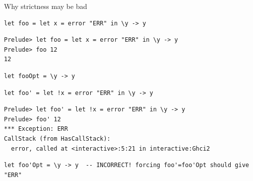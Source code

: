 \documentclass[8pt]{beamer}
\begin{document}
\begin{frame}[fragile]{Why strictness may be bad}
\begin{verbatim}
let foo = let x = error "ERR" in \y -> y
\end{verbatim}
\pause
\begin{verbatim}
Prelude> let foo = let x = error "ERR" in \y -> y
Prelude> foo 12
12
\end{verbatim}
\pause
\begin{verbatim}
let fooOpt = \y -> y
\end{verbatim}
\pause
\begin{verbatim}
let foo' = let !x = error "ERR" in \y -> y
\end{verbatim}
\pause
\begin{verbatim}
Prelude> let foo' = let !x = error "ERR" in \y -> y
Prelude> foo' 12
*** Exception: ERR
CallStack (from HasCallStack):
  error, called at <interactive>:5:21 in interactive:Ghci2
\end{verbatim}
\pause
\begin{verbatim}
let foo'Opt = \y -> y  -- INCORRECT! forcing foo'=foo'Opt should give "ERR"
\end{verbatim}
\end{frame}
\end{document}
